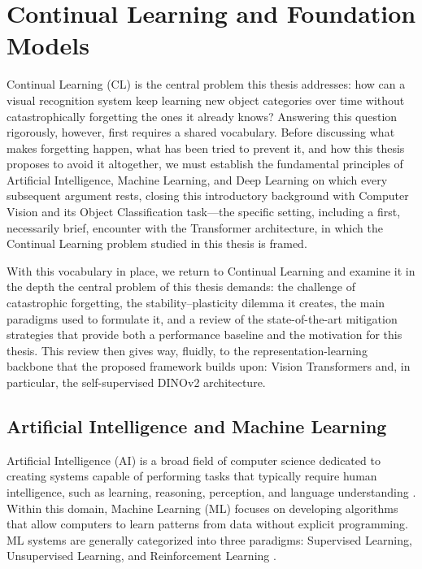 \chapter{Continual Learning and Foundation Models}
\label{ch:framework}

Continual Learning (CL) is the central problem this thesis addresses: how can a visual recognition system keep learning new object categories over time without catastrophically forgetting the ones it already knows? Answering this question rigorously, however, first requires a shared vocabulary. Before discussing what makes forgetting happen, what has been tried to prevent it, and how this thesis proposes to avoid it altogether, we must establish the fundamental principles of Artificial Intelligence, Machine Learning, and Deep Learning on which every subsequent argument rests, closing this introductory background with Computer Vision and its Object Classification task---the specific setting, including a first, necessarily brief, encounter with the Transformer architecture, in which the Continual Learning problem studied in this thesis is framed.

With this vocabulary in place, we return to Continual Learning and examine it in the depth the central problem of this thesis demands: the challenge of catastrophic forgetting, the stability--plasticity dilemma it creates, the main paradigms used to formulate it, and a review of the state-of-the-art mitigation strategies that provide both a performance baseline and the motivation for this thesis. This review then gives way, fluidly, to the representation-learning backbone that the proposed framework builds upon: Vision Transformers and, in particular, the self-supervised DINOv2 architecture.

\section{Artificial Intelligence and Machine Learning}
\label{sec:framework:ai_ml}

Artificial Intelligence (AI) is a broad field of computer science dedicated to creating systems capable of performing tasks that typically require human intelligence, such as learning, reasoning, perception, and language understanding \cite{RussellNorvig}. Within this domain, Machine Learning (ML) focuses on developing algorithms that allow computers to learn patterns from data without explicit programming. ML systems are generally categorized into three paradigms: Supervised Learning, Unsupervised Learning, and Reinforcement Learning \cite{Bishop2006}.

